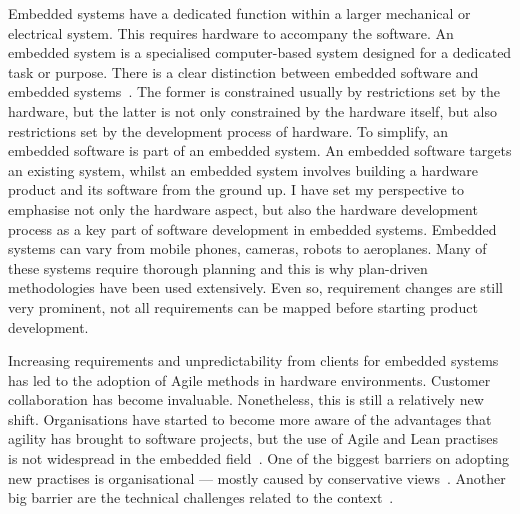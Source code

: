 \documentclass[english]{tktltiki2}
\begin{document}
Embedded systems have a dedicated function within a larger mechanical or electrical system. This requires hardware to accompany the software. An embedded system is a specialised computer-based system designed for a dedicated task or purpose. There is a clear distinction between embedded software and embedded systems~\cite{KRM13}. The former is constrained usually by restrictions set by the hardware, but the latter is not only constrained by the hardware itself, but also restrictions set by the development process of hardware. To simplify, an embedded software is part of an embedded system. An embedded software targets an existing system, whilst an embedded system involves building a hardware product and its software from the ground up. I have set my perspective to emphasise not only the hardware aspect, but also the hardware development process as a key part of software development in embedded systems. Embedded systems can vary from mobile phones, cameras, robots to aeroplanes. Many of these systems require thorough planning and this is why plan-driven methodologies have been used extensively. Even so, requirement changes are still very prominent, not all requirements can be mapped before starting product development.

Increasing requirements and unpredictability from clients for embedded systems has led to the adoption of Agile methods in hardware environments. Customer collaboration has become invaluable. Nonetheless, this is still a relatively new shift. Organisations have started to become more aware of the advantages that agility has brought to software projects, but the use of Agile and Lean practises is not widespread in the embedded field~\cite{CWR10, EB12, KRM13}. One of the biggest barriers on adopting new practises is organisational — mostly caused by conservative views~\cite{Pop02, HAB12}. Another big barrier are the technical challenges related to the context~\cite{KRM13}.
\end{document}
